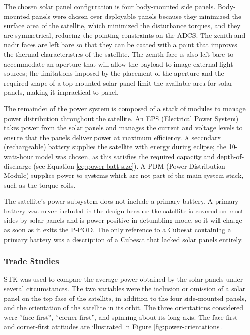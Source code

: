 \documentclass[12pt]{article}
\begin{document}
			The chosen solar panel configuration is four body-mounted side panels.  Body-mounted panels were chosen over deployable panels because they minimized the surface area of the satellite, which minimized the disturbance torques, and they are symmetrical, reducing the pointing constraints on the ADCS.  The zenith and nadir faces are left bare so that they can be coated with a paint that improves the thermal characteristics of the satellite.  The zenith face is also left bare to accommodate an aperture that will allow the payload to image external light sources; the limitations imposed by the placement of the aperture and the required shape of a top-mounted solar panel limit the available area for solar panels, making it impractical to panel.

The remainder of the power system is composed of a stack of modules to manage power distribution throughout the satellite.  An EPS (Electrical Power System) takes power from the solar panels and manages the current and voltage levels to ensure that the panels deliver power at maximum efficiency.  A secondary (rechargeable) battery supplies the satellite with energy during eclipse; the 10-watt-hour model was chosen, as this satisfies the required capacity and depth-of-discharge (see Equation \ref{eq:power-batt-size}).  A PDM (Power Distribution Module) supplies power to systems which are not part of the main system stack, such as the torque coils.

The satellite's power subsystem does not include a primary battery.  A primary battery was never included in the design because the satellite is covered on most sides by solar panels and is power-positive in detumbling mode, so it will charge as soon as it exits the P-POD.  The only reference to a Cubesat containing a primary battery was a description of a Cubesat that lacked solar panels entirely.\cite{libertad-1}

\subsubsection{Trade Studies}
			
			STK was used to compare the average power obtained by the solar panels under several circumstances.  The two variables were the inclusion or omission of a solar panel on the top face of the satellite, in addition to the four side-mounted panels, and the orientation of the satellite in its orbit.  The three orientations considered were ``face-first'', ``corner-first'', and spinning about its long axis.  The face-first and corner-first attitudes are illustrated in Figure \ref{fig:power-orientations}.
			
\end{document}
